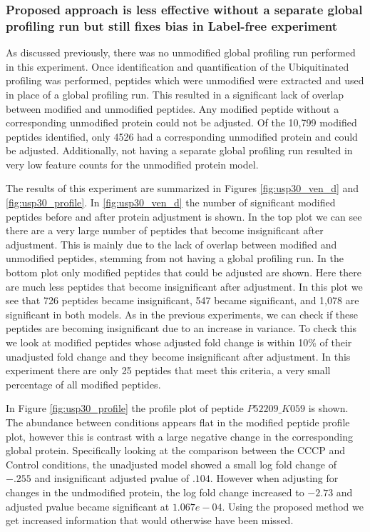 \documentclass[mcp]{article}
\numberwithin{table}{section}
\begin{document}
\subsubsection*{Proposed approach is less effective without a separate global profiling run but still fixes bias in Label-free experiment}

As discussed previously, there was no unmodified global profiling run performed in this experiment. Once identification and quantification of the Ubiquitinated profiling was performed, peptides which were unmodified were extracted and used in place of a global profiling run. This resulted in a significant lack of overlap between modified and unmodified peptides. Any modified peptide without a corresponding unmodified protein could not be adjusted. Of the 10,799 modified peptides identified, only 4526 had a corresponding unmodified protein and could be adjusted. Additionally, not having a separate global profiling run resulted in very low feature counts for the unmodified protein model.

The results of this experiment are summarized in Figures \ref{fig:usp30_ven_d} and \ref{fig:usp30_profile}. In \ref{fig:usp30_ven_d} the number of significant modified peptides before and after protein adjustment is shown. In the top plot we can see there are a very large number of peptides that become insignificant after adjustment. This is mainly due to the lack of overlap between modified and unmodified peptides, stemming from not having a global profiling run. In the bottom plot only modified peptides that could be adjusted are shown. Here there are much less peptides that become insignificant after adjustment. In this plot we see that 726 peptides became insignificant, 547 became significant, and 1,078 are significant in both models. As in the previous experiments, we can check if these peptides are becoming insignificant due to an increase in variance. To check this we look at modified peptides whose adjusted fold change is within 10\% of their unadjusted fold change and they become insignificant after adjustment. In this experiment there are only 25 peptides that meet this criteria, a very small percentage of all modified peptides.

In Figure \ref{fig:usp30_profile} the profile plot of peptide $P52209\_K059$ is shown. The abundance between conditions appears flat in the modified peptide profile plot, however this is contrast with a large negative change in the corresponding global protein. Specifically looking at the comparison between the CCCP and Control conditions, the unadjusted model showed a small log fold change of $-.255$ and insignificant adjusted pvalue of $.104$. However when adjusting for changes in the undmodified protein, the log fold change increased to $-2.73$ and adjusted pvalue became significant at $1.067e-04$. Using the proposed method we get increased information that would otherwise have been missed.
\end{document}
